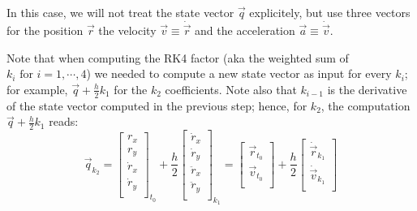 \documentclass[12pt,a4paper,twoside]{report}
\begin{document}
In this case, we will not treat the state vector \( \vec{q} \) explicitely, but use three vectors 
for the position \( \vec{r} \) the velocity \( \vec{v} \equiv \dot{\vec{r}} \) and 
the acceleration \( \vec{a} \equiv \dot{\vec{v}} \).

Note that when computing the RK4 factor (aka the weighted sum of \( k_i \text{ for } i=1,\cdots ,4 \))
we needed to compute a new state vector as input for every \( k_i \); 
for example, \( \vec{q} + \frac{h}{2} k_1 \) for the 
\( k_2 \) coefficients. Note also that \( k_{i-1} \) is the 
derivative of the state vector computed in the previous step; hence, for \( k_2 \), 
the computation \( \vec{q} + \frac{h}{2} k_1 \) reads:
\begin{equation}
  \vec{q}_{k_2} = 
  \begin{bmatrix}
    r_x \\
    r_y \\
    \dot{r}_x \\
    \dot{r}_y \\
  \end{bmatrix}_{t_0}
  +
  \frac{h}{2}
  \begin{bmatrix}
    \dot{r}_x \\
    \dot{r}_y \\
    \ddot{r}_x \\
    \ddot{r}_y \\
  \end{bmatrix}_{k_1}
  =
  \begin{bmatrix}
    \vec{r}_{t_0} \\
    \vec{v}_{t_0} \\
  \end{bmatrix}
  +
  \frac{h}{2}
  \begin{bmatrix}
    \dot{\vec{r}}_{k_1} \\
    \dot{\vec{v}}_{k_1} \\
  \end{bmatrix}
\end{equation}
\end{document}
